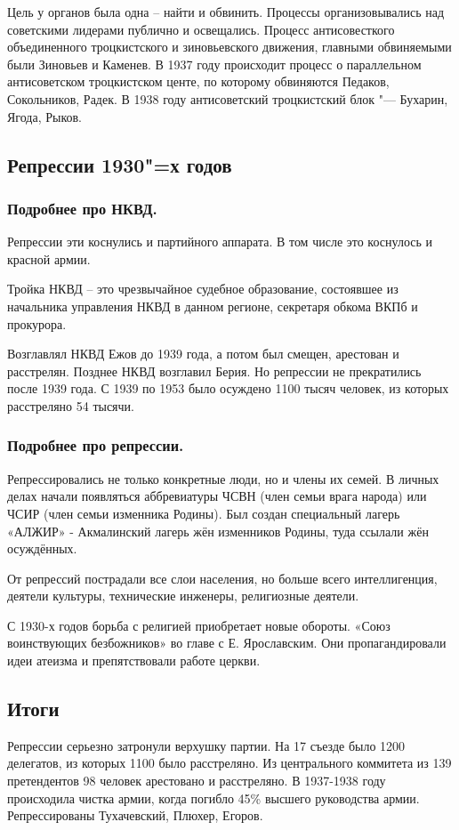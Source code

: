 Цель у органов была одна – найти и обвинить. Процессы организовывались над советскими лидерами публично и освещались. Процесс антисовесткого объединенного троцкистского и зиновьевского движения, главными обвиняемыми были Зиновьев и Каменев. В 1937 году происходит процесс о параллельном антисоветском троцкистском центе, по которому обвиняются Педаков, Сокольников, Радек. В 1938 году антисоветский троцкистский блок "--- Бухарин, Ягода, Рыков.

\subsection{Репрессии 1930"=х годов}

\subsubsection{\textbf{Подробнее про НКВД.}}

Репрессии эти коснулись и партийного аппарата. В том числе это коснулось и красной армии.

Тройка НКВД – это чрезвычайное судебное образование, состоявшее из начальника управления НКВД в данном регионе, секретаря обкома ВКПб и прокурора.  

Возглавлял НКВД Ежов до 1939 года, а потом был смещен, арестован и расстрелян. Позднее НКВД возглавил Берия. Но репрессии не прекратились после 1939 года. С 1939 по 1953 было осуждено 1100 тысяч человек, из которых расстреляно 54 тысячи. 

\subsubsection{\textbf{Подробнее про репрессии.}}

Репрессировались не только конкретные люди, но и члены их семей. В личных делах начали появляться аббревиатуры ЧСВН (член семьи врага народа) или ЧСИР (член семьи изменника Родины). Был создан специальный лагерь «АЛЖИР» - Акмалинский лагерь жён изменников Родины, туда ссылали жён осуждённых.

От репрессий пострадали все слои населения, но больше всего интеллигенция, деятели культуры, технические инженеры, религиозные деятели. 

С 1930-х годов борьба с религией приобретает новые обороты. «Союз воинствующих безбожников» во главе с Е. Ярославским. Они пропагандировали идеи атеизма и препятствовали работе церкви.

\subsection{Итоги}

Репрессии серьезно затронули верхушку партии. На 17 съезде было 1200 делегатов, из которых 1100 было расстреляно. Из центрального коммитета из 139 претендентов 98 человек арестовано и расстреляно. 
В 1937-1938 году происходила чистка армии, когда погибло 45\% высшего руководства армии. Репрессированы Тухачевский, Плюхер, Егоров. 